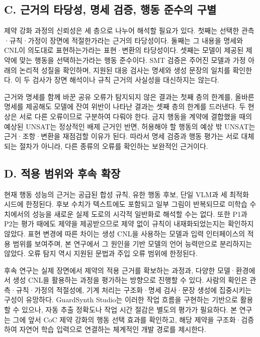 \documentclass[11pt,a4paper]{article}
\begin{document}
\subsection*{C. 근거의 타당성, 명세 검증, 행동 준수의 구별}

제약 강화 과정의 신뢰성은 세 층으로 나누어 해석할 필요가 있다. 첫째는 선택한 관측·규칙·가정이 장면에 적절한가라는 근거의 타당성이다. 둘째는 그 내용을 명세와 CNL이 의도대로 표현하는가라는 표현·변환의 타당성이다. 셋째는 모델이 제공된 제약에 맞는 행동을 선택하는가라는 행동 준수이다. SMT 검증은 주어진 모델과 가정 아래의 논리적 성질을 확인하며, 지원된 대응 검사는 명세와 생성 문장의 일치를 확인한다. 이 두 검사가 장면 해석이나 규칙 근거의 사실성을 대신하지는 않는다.\par

근거와 명세를 함께 바꾼 공유 오류가 탐지되지 않은 결과는 첫째 층의 한계를, 올바른 명세를 제공해도 모델에 잔여 위반이 나타난 결과는 셋째 층의 한계를 드러낸다. 두 현상은 서로 다른 오류이므로 구분하여 다뤄야 한다. 금지 행동을 계약에 결합했을 때의 예상된 UNSAT는 정상적인 배제 근거인 반면, 허용해야 할 행동의 예상 밖 UNSAT는 근거·조항·변환을 재점검할 이유가 된다. 따라서 명세 검증과 행동 평가는 서로 대체되는 절차가 아니라, 다른 종류의 오류를 확인하는 보완적인 근거이다.\par

\newpage
\subsection*{D. 적용 범위와 후속 확장}

현재 행동 성능의 근거는 공급된 합성 규칙, 유한 행동 후보, 단일 VLM과 세 최적화 시드에 한정된다. 후보 수치가 텍스트에도 포함되고 일부 그림이 반복되므로 미학습 수치에서의 성능을 새로운 실제 도로의 시각적 일반화로 해석할 수는 없다. 또한 P1과 P2는 평가 때에도 제약을 제공받으므로 제약 없이 규칙이 내재화되었는지는 확인하지 않았다. 표현 변경에 따른 차이는 생성 CNL을 사용하는 모델과 입력 인터페이스의 적용 범위를 보여주며, 본 연구에서 그 원인을 기반 모델의 언어 능력만으로 분리하지는 않았다. 오류 탐지 역시 지원된 문법과 주입 오류 범위에 한정된다.\par

후속 연구는 실제 장면에서 제약의 적용 근거를 확보하는 과정과, 다양한 모델·환경에서 생성 CNL을 활용하는 과정을 평가하는 방향으로 진행할 수 있다. 사람의 확인은 관측·규칙·가정의 적절성에, 기계 처리는 구조화·명세 검사·문장 생성에 집중시키는 구성이 유망하다. GuardSynth Studio는 이러한 작업 흐름을 구현하는 기반으로 활용할 수 있으나, 자동 추출 정확도나 작업 시간 절감은 별도의 평가가 필요하다. 본 연구는 그에 앞서 CoC 제약 강화의 행동 선택 효과를 확인하고, 해당 제약을 구조화·검증하여 자연어 학습 입력으로 연결하는 체계적인 개발 경로를 제시한다.\par
\end{document}
